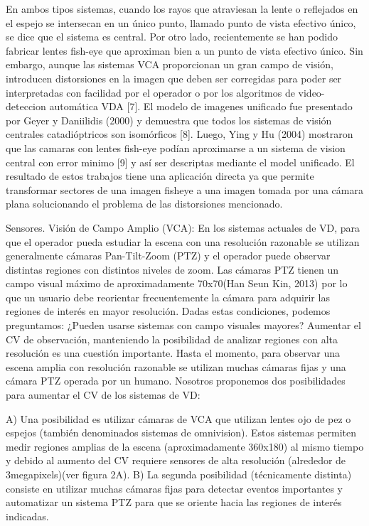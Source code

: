\documentclass[12pt,a4paper]{article}
\begin{document}
En ambos tipos sistemas, cuando los rayos que atraviesan la lente o reflejados en el espejo se intersecan en un único punto, llamado punto de vista efectivo único, se dice que el sistema es central.
Por otro lado, recientemente se han podido fabricar lentes fish-eye que aproximan bien a un punto de vista efectivo único.
Sin embargo, aunque las sistemas VCA proporcionan un gran campo de visión, introducen distorsiones en la imagen que deben ser corregidas para poder ser interpretadas con facilidad por el operador o por los algoritmos de video-deteccion automática VDA [7].
El modelo de imagenes unificado fue presentado por Geyer y Daniilidis (2000) y demuestra que todos los sistemas de visión centrales catadióptricos son isomórficos [8].
Luego, Ying y Hu (2004) mostraron que las camaras con lentes fish-eye podían aproximarse a un sistema de vision central con error minimo [9] y así ser descriptas mediante el model unificado.
El resultado de estos trabajos tiene una aplicación directa ya que permite transformar sectores de una imagen fisheye a una imagen tomada por una cámara plana solucionando el problema de las distorsiones mencionado.

Sensores. Visión de Campo Amplio (VCA): En los sistemas actuales de VD, para que el operador pueda estudiar la escena con una resolución razonable se utilizan generalmente cámaras Pan-Tilt-Zoom (PTZ) y el operador puede observar distintas regiones con distintos niveles de zoom. Las cámaras PTZ tienen un campo visual máximo de aproximadamente 70\degree x70\degree (Han Seun Kin, 2013) por lo que un usuario debe reorientar frecuentemente la cámara para adquirir las regiones de interés en mayor resolución. Dadas estas condiciones, podemos preguntamos: ¿Pueden usarse sistemas con campo visuales mayores? Aumentar el CV de observación, manteniendo la posibilidad de analizar regiones con alta resolución es una cuestión importante. Hasta el momento, para observar una escena amplia con resolución razonable se utilizan muchas cámaras fijas y una cámara PTZ operada por un humano. Nosotros proponemos dos posibilidades para aumentar el CV de los sistemas de VD:

A) Una posibilidad es utilizar cámaras de VCA que utilizan lentes ojo de pez o espejos (también denominados sistemas de omnivision). Estos sistemas permiten medir regiones amplias de la escena (aproximadamente 360\degree x180\degree) al mismo tiempo y debido al aumento del CV requiere sensores de alta resolución (alrededor de 3megapixels)(ver figura 2A).
B) La segunda posibilidad (técnicamente distinta) consiste en utilizar muchas cámaras fijas para detectar eventos importantes y automatizar un sistema PTZ para que se oriente hacia las regiones de interés indicadas.
\end{document}
